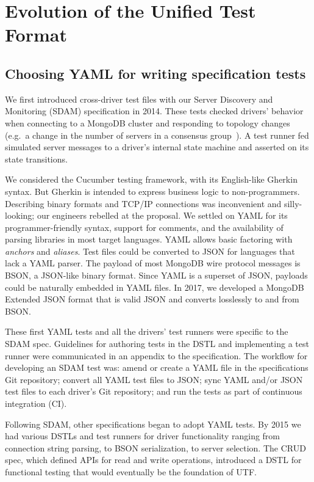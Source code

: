 \documentclass[conference]{IEEEtran}
\begin{document}
\section{Evolution of the Unified Test Format}

\subsection{Choosing YAML for writing specification tests}

We first introduced cross-driver test files with our Server Discovery and Monitoring (SDAM) specification in 2014. These tests checked drivers' behavior when connecting to a MongoDB cluster and responding to topology changes (e.g.\ a change in the number of servers in a consensus group~\cite{schultz_design_2022}). A test runner fed simulated server messages to a driver's internal state machine and asserted on its state transitions.

We considered the Cucumber testing framework, with its English-like Gherkin syntax. But Gherkin is intended to express business logic to non-programmers. Describing binary formats and TCP/IP connections was inconvenient and silly-looking; our engineers rebelled at the proposal. We settled on YAML for its programmer-friendly syntax, support for comments, and the availability of parsing libraries in most target languages. YAML allows basic factoring with \textit{anchors} and \textit{aliases}. Test files could be converted to JSON for languages that lack a YAML parser. The payload of most MongoDB wire protocol messages is BSON, a JSON-like binary format. Since YAML is a superset of JSON, payloads could be naturally embedded in YAML files. In 2017, we developed a MongoDB Extended JSON format that is valid JSON and converts losslessly to and from BSON.

These first YAML tests and all the drivers' test runners were specific to the SDAM spec. Guidelines for authoring tests in the DSTL and implementing a test runner were communicated in an appendix to the specification. The workflow for developing an SDAM test was: amend or create a YAML file in the specifications Git repository; convert all YAML test files to JSON; sync YAML and/or JSON test files to each driver's Git repository; and run the tests as part of continuous integration (CI).

Following SDAM, other specifications began to adopt YAML tests. By 2015 we had various DSTLs and test runners for driver functionality ranging from connection string parsing, to BSON serialization, to server selection. The CRUD spec, which defined APIs for read and write operations, introduced a DSTL for functional testing that would eventually be the foundation of UTF.
\end{document}
